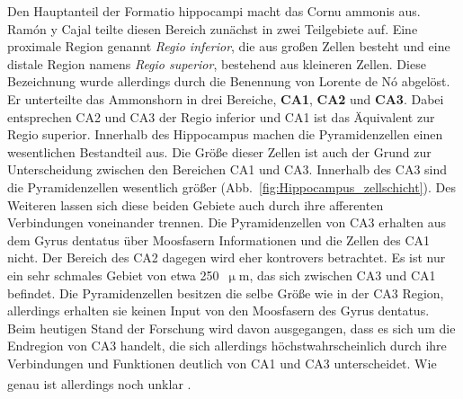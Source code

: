 \documentclass[12pt,a4paper,pdftex]{article}
\begin{document}
Den Hauptanteil der Formatio hippocampi macht das Cornu ammonis aus. Ramón y Cajal teilte diesen Bereich zunächst in zwei Teilgebiete auf. Eine proximale Region genannt \textit{Regio inferior}, die aus großen Zellen besteht und eine distale Region namens \textit{Regio superior}, bestehend aus kleineren Zellen. Diese Bezeichnung wurde allerdings durch die Benennung von Lorente de Nó abgelöst. Er unterteilte das Ammonshorn in drei Bereiche, \textbf{CA1}, \textbf{CA2} und \textbf{CA3}. Dabei entsprechen CA2 und CA3 der Regio inferior und CA1 ist das Äquivalent zur Regio superior. Innerhalb des Hippocampus machen die Pyramidenzellen einen wesentlichen Bestandteil aus. Die Größe dieser Zellen ist auch der Grund zur Unterscheidung zwischen den Bereichen CA1 und CA3. Innerhalb des CA3 sind die Pyramidenzellen wesentlich größer (Abb.~\ref{fig:Hippocampus_zellschicht}). Des Weiteren lassen sich diese beiden Gebiete auch durch ihre afferenten Verbindungen voneinander trennen. Die Pyramidenzellen von CA3 erhalten aus dem Gyrus dentatus über Moosfasern Informationen und die Zellen des CA1 nicht. Der Bereich des CA2 dagegen wird eher kontrovers betrachtet. Es ist nur ein sehr schmales Gebiet von etwa 250~$\upmu$m, das sich zwischen CA3 und CA1 befindet. Die Pyramidenzellen besitzen die selbe Größe wie in der CA3 Region, allerdings erhalten sie keinen Input von den Moosfasern des Gyrus dentatus. Beim heutigen Stand der Forschung wird davon ausgegangen, dass es sich um die Endregion von CA3 handelt, die sich allerdings höchstwahrscheinlich durch ihre Verbindungen und Funktionen deutlich von CA1 und CA3 unterscheidet. Wie genau ist allerdings noch unklar \textsuperscript{\cite[20]{paxinos2014rat}}.\\
\end{document}
